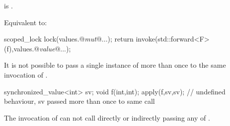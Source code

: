 \begin{itemdescr}
    

\pnum
\constraints
{} is .

\pnum
\effects
Equivalent to:

\begin{codeblock}
    scoped_lock lock(values.@\emph{mut}@...);
    return invoke(std::forward<F>(f),values.@\emph{value}@...);
\end{codeblock}

\begin{note} It is not possible to pass a single instance of 
more than once to the same invocation of .
\begin{example}

\begin{codeblock}
      synchronized_value<int> sv;
      void f(int,int);
      apply(f,sv,sv); // undefined behaviour, sv passed more than once to same call
\end{codeblock}
\end{example}
 \end{note}

\begin{note} The invocation of  can not call 
directly or indirectly passing any of . 
\end{note}
\end{itemdescr}

